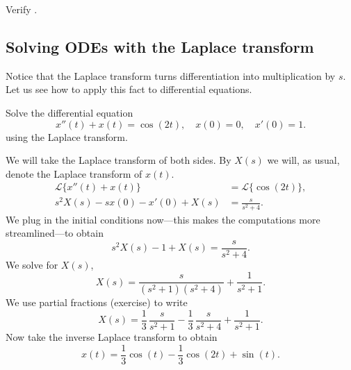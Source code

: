 \documentclass{ximera}
\begin{document}
\begin{exercise}
    Verify .
\end{exercise}

\subsection{Solving ODEs with the Laplace transform}

Notice that the Laplace transform turns differentiation into multiplication by $s$.  Let us see how to apply this fact to differential equations.

\begin{example}
    Solve the differential equation
    \begin{equation*}
        x''(t) + x(t) = \cos (2t), \quad x(0) = 0, \quad x'(0) = 1 .
    \end{equation*}
    using the Laplace transform.
\end{example}

\begin{exampleSol}
    We will take the Laplace transform of both sides. By $X(s)$ we will, as usual, denote the Laplace transform of $x(t)$.
    \begin{align*}
        \mathcal{L} \bigl\{ x''(t) + x(t) \bigr\} & = \mathcal{L} \bigl\{ \cos (2t) \bigr\} , \\
        s^2 X(s) -sx(0)-x'(0) + X(s) & = \frac{s}{s^2 + 4} .
    \end{align*}
    We plug in the initial conditions now---this makes the computations more streamlined---to obtain
    \begin{equation*}
        s^2 X(s) -1 + X(s) = \frac{s}{s^2 + 4} .
    \end{equation*}
    We solve for $X(s)$,
    \begin{equation*}
        X(s) = \frac{s}{(s^2+1)(s^2 + 4)} + \frac{1}{s^2+1} .
    \end{equation*}
    We use partial fractions (exercise) to write
    \begin{equation*}
        X(s) =\frac{1}{3} \, \frac{s}{s^2+1} - \frac{1}{3}\, \frac{s}{s^2+4} + \frac{1}{s^2+1} .
    \end{equation*}
    Now take the inverse Laplace transform to obtain
    \begin{equation*}
        x(t) =\frac{1}{3}  \cos (t) - \frac{1}{3} \cos (2t) + \sin (t) .
    \end{equation*}
\end{exampleSol}
\end{document}

